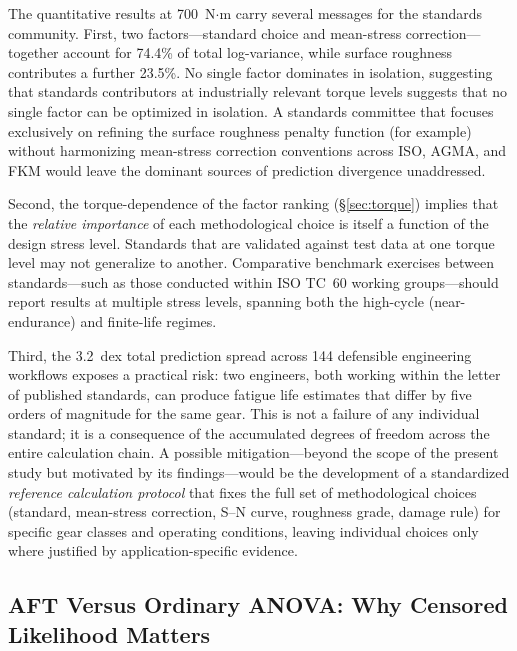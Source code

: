 \documentclass[12pt,a4paper]{article}
\begin{document}
The quantitative results at 700~N$\cdot$m carry several messages for
the standards community. First, two factors---standard choice and
mean-stress correction---together account for 74.4\% of total
log-variance, while surface roughness contributes a further 23.5\%.
No single factor dominates in isolation, suggesting that standards
contributors at industrially relevant torque levels suggests that
no single factor can be optimized in isolation. A standards committee
that focuses exclusively on refining the surface roughness penalty
function (for example) without harmonizing mean-stress correction
conventions across ISO, AGMA, and FKM would leave the dominant
sources of prediction divergence unaddressed.

Second, the torque-dependence of the factor ranking
(\S\ref{sec:torque}) implies that the \emph{relative importance} of
each methodological choice is itself a function of the design stress
level. Standards that are validated against test data at one torque
level may not generalize to another. Comparative benchmark exercises
between standards---such as those conducted within ISO TC~60 working
groups---should report results at multiple stress levels,
spanning both the high-cycle (near-endurance) and finite-life regimes.

Third, the 3.2~dex total prediction spread across 144 defensible
engineering workflows exposes a practical risk: two engineers, both
working within the letter of published standards, can produce fatigue
life estimates that differ by five orders of magnitude for the same
gear. This is not a failure of any individual standard; it is a
consequence of the accumulated degrees of freedom across the entire
calculation chain. A possible mitigation---beyond the scope of the
present study but motivated by its findings---would be the development
of a standardized \emph{reference calculation protocol} that fixes the
full set of methodological choices (standard, mean-stress correction,
S--N curve, roughness grade, damage rule) for specific gear classes and
operating conditions, leaving individual choices only where justified
by application-specific evidence.

\subsection{AFT Versus Ordinary ANOVA: Why Censored Likelihood Matters}
\label{sec:aft_vs_anova}
\end{document}
